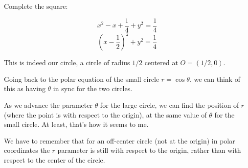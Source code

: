 \documentclass[11pt, oneside]{article}
\begin{document}
Complete the square:

\[ x^2 - x + \frac{1}{4} + y^2 = \frac{1}{4} \]
\[ (x - \frac{1}{2})^2 + y^2 = \frac{1}{4} \]

This is indeed our circle, a circle of radius $1/2$ centered at $O = (1/2,0)$.

Going back to the polar equation of the small circle $r = \cos \theta$, we can think of this as having $\theta$ in sync for the two circles.

As we advance the parameter $\theta$ for the large circle, we can find the position of $r$ (where the point is with respect to the origin), at the same value of $\theta$ for the small circle.  At least, that's how it seems to me.

We have to remember that for an off-center circle (not at the origin) in polar coordinates the $r$ parameter is still with respect to the origin, rather than with respect to the center of the circle.
\end{document}
